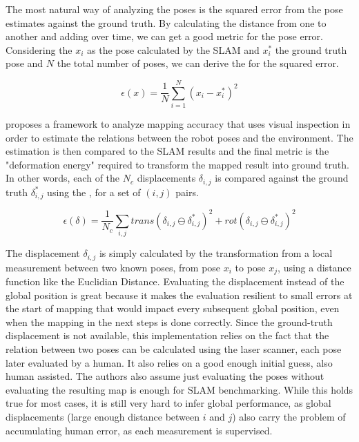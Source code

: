 The most natural way of analyzing the poses is the squared error from the pose estimates against the ground truth. By calculating the distance from one to another and adding over time, we can get a good metric for the pose error. Considering the $x_i$ as the pose calculated by the SLAM and $x_i^*$ the ground truth pose and $N$ the total number of poses, we can derive the  for the squared error.

\begin{equation}\label{eq:error_squared}
\epsilon(x) = \frac{1}{N} \sum_{i = 1}^N (x_i - x_i^*)^2
\end{equation}

\citeauthor{kummerle2009measuring} proposes a framework to analyze mapping accuracy that uses visual inspection in order to estimate the relations between the robot poses and the environment. The estimation is then compared to the SLAM results and the final metric is the "deformation energy" required to transform the mapped result into ground truth. In other words, each of the $N_c$ displacements $\delta_{i,j}$ is compared against the ground truth $\delta_{i,j}^*$ using the , for a set of  $(i,j)$ pairs.

\begin{equation}\label{eq:displacement}
    \epsilon(\delta) = \frac{1}{N_c} \sum_{i, j} trans(\delta_{i,j} \ominus \delta_{i,j}^*)^2 + rot(\delta_{i,j} \ominus \delta_{i,j}^*)^2
\end{equation}

 The displacement $\delta_{i, j}$ is simply calculated by the transformation from a local measurement between two known poses, from pose $x_i$ to pose $x_j$, using a distance function like the Euclidian Distance. Evaluating the displacement instead of the global position is great because it makes the evaluation resilient to small errors at the start of mapping that would impact every subsequent global position, even when the mapping in the next steps is done correctly. Since the ground-truth displacement is not available, this implementation relies on the fact that the relation between two poses can be calculated using the laser scanner, each pose later evaluated by a human. It also relies on a good enough initial guess, also human assisted. The authors also assume just evaluating the poses without evaluating the resulting map is enough for SLAM benchmarking. While this holds true for most cases, it is still very hard to infer global performance, as global displacements (large enough distance between $i$ and $j$) also carry the problem of accumulating human error, as each measurement is supervised.
 
